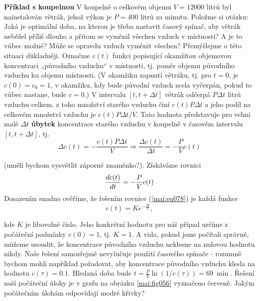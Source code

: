 \begin{mdframed}[style=mdexam]
  \begin{example}\label{mai:exam085}
    \textbf{Příklad s koupelnou}\newline
      V koupelně o celkovém objemu \(V = \num{12000}\) litrů byl nainstalován větrák, jehož výkon je
      \(P = \num{400}\) litrů za minutu. Položme si otázku: Jaká je optimální doba, na kterou je
      třeba nastavit časový spínač, aby větrák neběžel příliš dlouho a přitom se vyměnil všechen
      vzduch v místnosti? A je to vůbec možné? Může se opravdu vzduch vyměnit všechen? Přemýšlejme o
      této situaci důkladněji. Označme \(c(t)\) funkci popisující okamžitou objemovou koncentraci
      „původního vzduchu“ v místnosti, tj. poměr objemu původního vzduchu ku objemu místnosti. (V
      okamžiku zapnutí větráku, tj. pro \(t = 0\), je \(c(0) = c_0 = 1\), v okamžiku, kdy bude
      původní vzduch zcela vyčerpán, pokud to vůbec nastane, bude \(c = 0\).) V intervalu \([t,t +
      \Delta t]\) větrák odčerpá \(P\Delta t\) litrů vzduchu celkem, z toho množství starého vzduchu
      činí \(c(t)P\Delta t\) a jeho podíl na celkovém množství vzduchu je \(c(t)P\Delta t/V\). Tato
      hodnota představuje pro velmi malé \(\Delta t\) \textbf{úbytek} koncentrace starého vzduchu v
      koupelně v časovém intervalu \([t, t + \Delta t]\), tj.
      \begin{equation*}
        \Delta c(t) = - \frac{c(t)P\Delta t}{V} \Rightarrow 
        \dfrac{\Delta c(t)}{\Delta t} = - \dfrac{P}{V}c(t)
      \end{equation*}
      
      (uměli bychom vysvětlit záporné znaménko?). Získáváme rovnici
      \begin{equation}\label{mai:eq078}
        \dfrac{d c(t)}{d t} = - \dfrac{P}{V}c(t)
      \end{equation}
      Dosazením snadno ověříme, že řešením rovnice (\ref{mai:eq078}) je každá funkce
      \begin{equation*}
        c(t) = Ke^{-\frac{Pt}{V}},
      \end{equation*}

      {\centering
      \captionsetup{type=figure}
      \label{mai:fig056}
      \par}
      
      kde \(K\) je libovolné číslo. Jeho konkrétní hodnotu pro náš případ určíme z počáteční
      podmínky \(c(0) = 1\), tj. \(K = 1\). A vida, pokud jsme počítali správně, můžeme usoudit, že
      koncentrace původního vzduchu neklesne na nulovou hodnotu nikdy. Naše řešení samozřejmě
      nevylučuje použití časového spínače - rozumně bychom mohli například požadovat, aby
      koncentrace původního vzduchu klesla na hodnotu \(c(\tau) = \num{0.1}\). Hledaná doba bude \(t
      =\frac{P}{V}\ln(1/c(\tau)) =\SI{69}{\min}\). Řešení naší počáteční úlohy je v grafu na obrázku
      \ref{mai:fig056} vyznačeno červeně. Jakým počátečním úlohám odpovídají modré křivky?
  \end{example}
\end{mdframed}